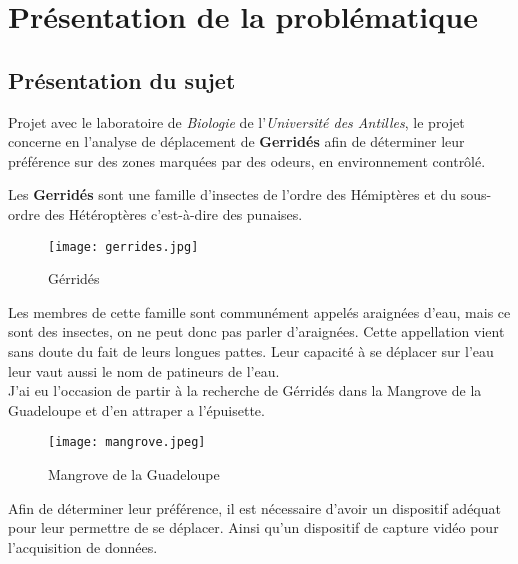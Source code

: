 \chapter{Présentation de la problématique}
    \section{Présentation du sujet}
    Projet avec le laboratoire de \textit{Biologie} de l'\textit{Université des Antilles}, le projet concerne en l'analyse de déplacement de \textbf{Gerridés} afin de déterminer leur préférence sur des zones marquées par des odeurs, en environnement contrôlé.

    \vspace{0.5cm}

    Les \textbf{Gerridés} sont une famille d'insectes de l'ordre des Hémiptères et du sous-ordre des Hétéroptères c'est-à-dire des punaises.
    \begin{figure}[h]
        \centering
        \texttt{[image: gerrides.jpg]}
        \caption{Gérridés}        
    \end{figure}

    \vspace{0.1cm}

    \begin{flushleft}
        Les membres de cette famille sont communément appelés araignées d’eau, mais ce sont des insectes, on ne peut donc pas parler d'araignées. Cette appellation vient sans doute du fait de leurs longues pattes. Leur capacité à se déplacer sur l'eau leur vaut aussi le nom de patineurs de l'eau.\\[0.2cm]
        
        J'ai eu l'occasion de partir à la recherche de Gérridés dans la Mangrove de la Guadeloupe et d'en attraper a l'épuisette.

        \begin{figure}[h]
            \centering
            \texttt{[image: mangrove.jpeg]}
            \caption{Mangrove de la Guadeloupe}
        \end{figure}


    \end{flushleft}

    \vspace{0.5cm}

    Afin de déterminer leur préférence, il est nécessaire d'avoir un dispositif adéquat pour leur permettre de se déplacer.
    Ainsi qu'un dispositif de capture vidéo pour l'acquisition de données.

